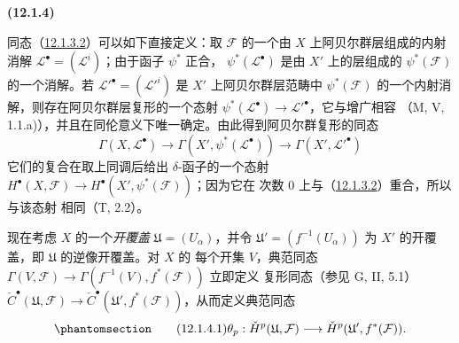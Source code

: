 \documentclass[UTF8,fontset=none,11pt,oneside,openany]{ctexbook}
\newenvironment{env}[1][]{%
  \par\medskip\noindent\textbf{(#1)}\ %
}{\par}
\let\EGAOriginalLabel\label
\renewcommand{\label}[1]{\phantomsection\EGAOriginalLabel{#1}}
\begin{document}
\begin{env}[12.1.4]
\label{0.12.1.4-fr}
同态（\hyperref[0.12.1.3.2-fr]{12.1.3.2}）可以如下直接定义：取
$\mathcal F$ 的一个由 $X$ 上阿贝尔群层组成的内射消解
$\mathcal L^\bullet=(\mathcal L^i)$；由于函子 $\psi^*$ 正合，
$\psi^*(\mathcal L^\bullet)$ 是由 $X'$ 上的层组成的
$\psi^*(\mathcal F)$ 的一个消解。若
$\mathcal L'^\bullet=(\mathcal L'^i)$ 是 $X'$ 上阿贝尔群层范畴中
$\psi^*(\mathcal F)$ 的一个内射消解，则存在阿贝尔群层复形的一个态射
$\psi^*(\mathcal L^\bullet)\to\mathcal L'^\bullet$，它与增广相容
（M, V, 1.1.a)），并且在同伦意义下唯一确定。由此得到阿贝尔群复形的同态
\[
\Gamma(X,\mathcal L^\bullet)\longrightarrow
\Gamma(X',\psi^*(\mathcal L^\bullet))\longrightarrow
\Gamma(X',\mathcal L'^\bullet)
\]
它们的复合在取上同调后给出 $\delta$-函子的一个态射
$H^\bullet(X,\mathcal F)\to H^\bullet(X',\psi^*(\mathcal F))$；因为它在
次数 0 上与（\hyperref[0.12.1.3.2-fr]{12.1.3.2}）重合，所以与该态射
相同（T, 2.2）。

现在考虑 $X$ 的一个\emph{开覆盖} $\mathfrak U=(U_\alpha)$，并令
$\mathfrak U'=(f^{-1}(U_\alpha))$ 为 $X'$ 的开覆盖，即 $\mathfrak U$ 的逆像开覆盖。对 $X$ 的
每个开集 $V$，典范同态
$\Gamma(V,\mathcal F)\to\Gamma(f^{-1}(V),f^*(\mathcal F))$ 立即定义
复形同态（参见 G, II, 5.1）
$\check C^\bullet(\mathfrak U,\mathcal F)\to
\check C^\bullet(\mathfrak U',f^*(\mathcal F))$，从而定义典范同态
\[
\label{0.12.1.4.1-fr}
\tag{12.1.4.1}
\theta_p:\check H^p(\mathfrak U,\mathcal F)
\longrightarrow\check H^p(\mathfrak U',f^*(\mathcal F)).
\]


\end{env}
\end{document}

